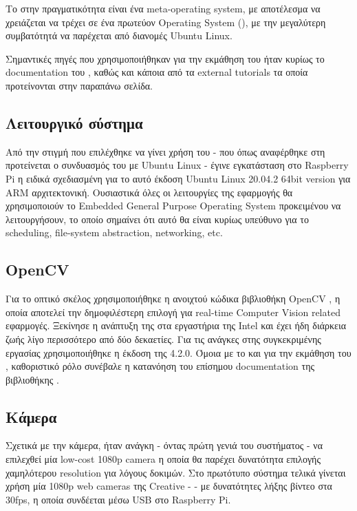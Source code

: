 Το  στην πραγματικότητα είναι ένα meta-operating system, με αποτέλεσμα να χρειάζεται να τρέχει σε ένα πρωτεύον Operating System (), με την μεγαλύτερη συμβατότητά να παρέχεται από διανομές Ubuntu Linux. 

Σημαντικές πηγές που χρησιμοποιήθηκαν για την εκμάθηση του  ήταν κυρίως το documentation του \cite{ros-doc}, καθώς και κάποια από τα external tutorials τα οποία προτείνονται στην παραπάνω σελίδα.

\subsection{Λειτουργικό σύστημα}
Από την στιγμή που επιλέχθηκε να γίνει χρήση του  - που όπως αναφέρθηκε στη  προτείνεται ο συνδυασμός του με Ubuntu Linux - έγινε εγκατάσταση στο Raspberry Pi η ειδικά σχεδιασμένη για το αυτό έκδοση Ubuntu Linux 20.04.2 64bit version για ΑRM \cite{ubuntu-raspberry} αρχιτεκτονική. Ουσιαστικά όλες οι λειτουργίες της εφαρμογής θα χρησιμοποιούν το Embedded General Purpose Operating System προκειμένου να λειτουργήσουν, το οποίο σημαίνει ότι αυτό θα είναι κυρίως υπεύθυνο για το scheduling, file-system abstraction, networking, etc. 

\subsection{OpenCV}
Για το οπτικό σκέλος χρησιμοποιήθηκε η ανοιχτού κώδικα βιβλιοθήκη OpenCV \cite{opencv}, η οποία αποτελεί την δημοφιλέστερη επιλογή για real-time Computer Vision related εφαρμογές. Ξεκίνησε η ανάπτυξη της στα εργαστήρια της Intel και έχει ήδη διάρκεια ζωής λίγο περισσότερο από δύο δεκαετίες. Για τις ανάγκες στης συγκεκριμένης ε\-ργα\-σίας χρησιμοποιήθηκε η έκδοση της 4.2.0. Όμοια με το  και για την εκμάθηση του , καθοριστικό ρόλο συνέβαλε η κατανόηση του επίσημου documentation της βιβλιοθήκης \cite{opencv-4-2-0-doc}.

\subsection{Κάμερα}
Σχετικά με την κάμερα, ήταν ανάγκη - όντας πρώτη γενιά του συστήματος -  να επιλεχθεί μία low-cost 1080p camera η οποία θα παρέχει δυνατότητα επιλογής χαμηλότερου resolution για λόγους δοκιμών. Στο πρωτότυπο σύστημα τελικά γίνεται χρήση μία 1080p web cameras της Creative \cite{creative-camera} -  - με δυνατότητες λήξης βίντεο στα 30fps, η οποία συνδέεται μέσω USB στο Raspberry Pi.

